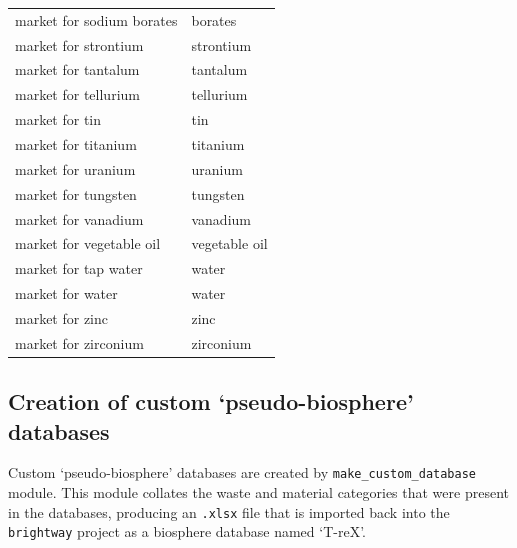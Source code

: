 \documentclass{article}
\renewcommand{\texttt}[1]{{\ttfamily\small\nolinkurl{#1}}}
\begin{document}
\begin{longtable}{ll}
    market for sodium borates  & borates                                                                                           \\
    market for strontium       & strontium                                                                                         \\
    market for tantalum        & tantalum                                                                                          \\
    market for tellurium       & tellurium                                                                                         \\
    market for tin             & tin                                                                                               \\
    market for titanium        & titanium                                                                                          \\
    market for uranium         & uranium                                                                                           \\
    market for tungsten        & tungsten                                                                                          \\
    market for vanadium        & vanadium                                                                                          \\
    market for vegetable oil   & vegetable oil                                                                                     \\
    market for tap water       & water                                                                                             \\
    market for water           & water                                                                                             \\
    market for zinc            & zinc                                                                                              \\
    market for zirconium       & zirconium                                                                                         \\
    \bottomrule
\end{longtable}

\subsection{Creation of custom `pseudo-biosphere' databases}
Custom `pseudo-biosphere' databases are created by \texttt{make\_custom\_database} module. This module collates the waste and material categories that were present in the databases, producing an \texttt{.xlsx} file that is imported back into the \texttt{brightway} project as a biosphere database named `T-reX'.
\end{document}
